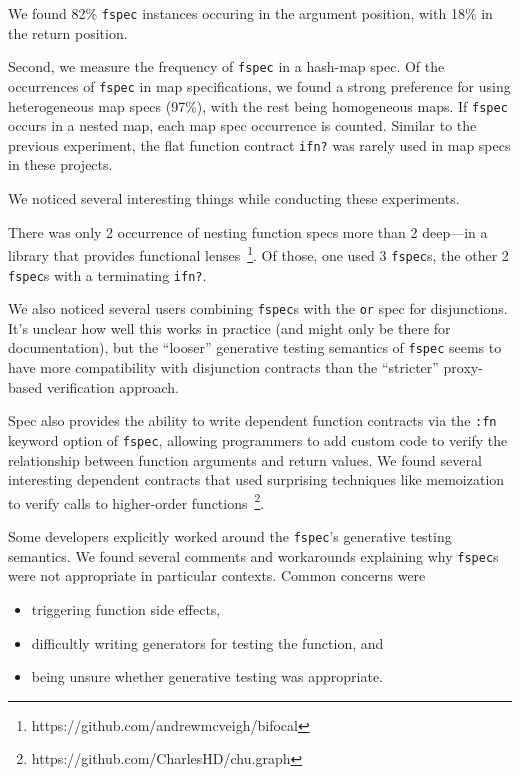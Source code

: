 We found 82\% \texttt{fspec} instances occuring in the argument position,
with 18\% in the return position.

Second, we measure the frequency of \texttt{fspec} in a hash-map spec.
Of the occurrences of \texttt{fspec} in map specifications, 
we found a strong preference for using heterogeneous map specs (97\%),
with the rest being homogeneous maps.
If \texttt{fspec} occurs in a nested map, each map spec occurrence is counted.
Similar to the previous experiment, the flat function contract \texttt{ifn?} was rarely used 
in map specs in these projects.

We noticed several interesting things while conducting these experiments.

There was only 2 occurrence of nesting function specs more than 2 deep---in a library
that provides functional lenses~\footnote{https://github.com/andrewmcveigh/bifocal}.
Of those, one used 3 \texttt{fspec}s, the other 2 \texttt{fspec}s with a terminating \texttt{ifn?}.

We also noticed several users combining \texttt{fspec}s with the \texttt{or} spec
for disjunctions. It's unclear how well this works in practice (and might only be
there for documentation), but the ``looser'' generative testing semantics of \texttt{fspec}
seems to have more compatibility with disjunction contracts than the ``stricter''
proxy-based verification approach.

Spec also provides the ability to write dependent function contracts via the \texttt{:fn}
keyword option of \texttt{fspec}, allowing programmers
to add custom code to verify the relationship between function arguments and return values.
We found several interesting dependent contracts that used surprising techniques like
memoization to verify calls to higher-order functions~\footnote{https://github.com/CharlesHD/chu.graph}.

Some developers explicitly worked around the \texttt{fspec}'s generative testing semantics.
We found several comments and workarounds explaining why \texttt{fspec}s were not
appropriate in particular contexts. Common concerns were
\\
\begin{itemize}
	\item triggering function side effects,
	\item difficultly writing generators for testing the function, and
	\item being unsure whether generative testing was appropriate.
\end{itemize}

